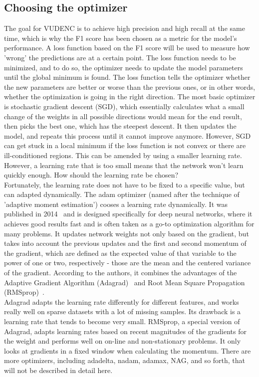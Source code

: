 \documentclass[
a4paper,
pagesize,
pdftex,
12pt,
twoside, %
BCOR=5mm, %
ngerman,
fleqn,
final,
]{scrartcl}
\begin{document}
	\subsection{Choosing the optimizer}\label{optimizer}
	The goal for VUDENC is to achieve high precision and high recall at the same time, which is why the F1 score has been chosen as a metric for the model's performance. A loss function based on the F1 score will be used to measure how 'wrong' the predictions are at a certain point. The loss function needs to be minimized, and to do so, the optimizer needs to update the model parameters until the global minimum is found. The loss function tells the optimizer whether the new parameters are better or worse than the previous ones, or in other words, whether the optimization is going in the right direction. The most basic optimizer is stochastic gradient descent (SGD), which essentially calculates what a small change of the weights in all possible directions would mean for the end result, then picks the best one, which has the steepest descent. It then updates the model, and repeats this process until it cannot improve anymore. However, SGD can get stuck in a local minimum if the loss function is not convex or there are ill-conditioned regions. This can be amended by using a smaller learning rate. However, a learning rate that is too small means that the network won't learn quickly enough. How should the learning rate be chosen?\\
	Fortunately, the learning rate does not have to be fixed to a specific value, but can adapted dynamically. The adam optimizer (named after the technique of 'adaptive moment estimation') cooses a learning rate dynamically. It was published in 2014~\cite{Kingma.2014} and is designed specifically for deep neural networks, where it achieves good results fast and is often taken as a go-to optimization algorithm for many problems. It updates network weights not only based on the gradient, but takes into account the previous updates and the first and second momentum of the gradient, which are defined as the expected value of that variable to the power of one or two, respectively - those are the mean and the centered variance of the gradient. According to the authors, it combines the advantages of the Adaptive Gradient Algorithm (Adagrad)~\cite{Duchi.2011} and Root Mean Square Propagation (RMSprop)~\cite{Tieleman.2012}.\\
	Adagrad adapts the learning rate differently for different features, and works really well on sparse datasets with a lot of missing samples. Its drawback is a learning rate that tends to become very small. RMSprop, a special version of Adagrad, adapts learning rates based on recent magnitudes of the gradients for the weight and performs well on on-line and non-stationary problems. It only looks at gradients in a fixed window when calculating the momentum. There are more optimizers, including adadelta, nadam, adamax, NAG, and so forth, that will not be described in detail here.\\
\end{document}
